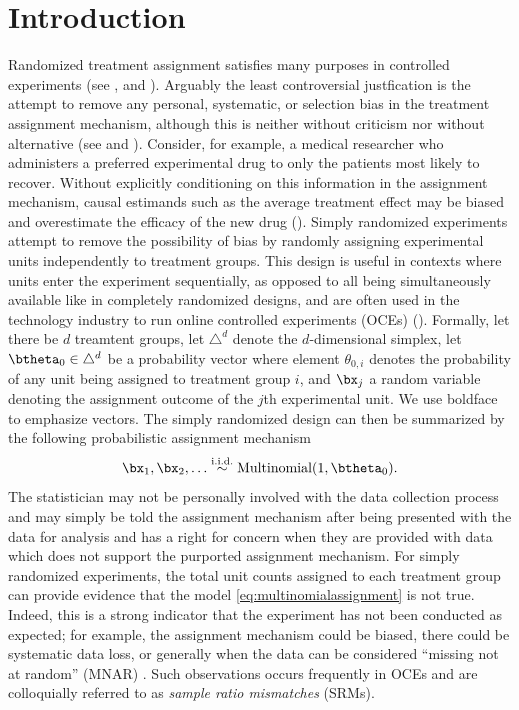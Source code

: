\documentclass[11pt]{article}
\begin{document}
\section{Introduction}
\label{sec:intro}
Randomized treatment assignment satisfies many purposes in controlled experiments (see \cite{kempthorne}, \cite{cox} and \cite{rubin}).
Arguably the least controversial justfication is the attempt to remove any personal, systematic, or selection bias in the treatment assignment mechanism, although this is neither without criticism nor without alternative (see \cite{lindley} and \cite{kadane}).
Consider, for example, a medical researcher who administers a preferred experimental drug to only the patients most likely to recover.
Without explicitly conditioning on this information in the assignment mechanism, causal estimands such as the average treatment effect may be biased and overestimate the efficacy of the new drug (\cite{berry}).
Simply randomized experiments attempt to remove the possibility of bias by randomly assigning experimental units independently to treatment groups.
This design is useful in contexts where units enter the experiment sequentially, as opposed to all being simultaneously available like in completely randomized designs, and are often used in the technology industry to run online controlled experiments (OCEs) (\cite{oce}).
Formally, let there be $d$ treamtent groups, let $\triangle^d$ denote the $d$-dimensional simplex, let $\btheta_0 \in \triangle^d$ be a probability vector where element $\theta_{0,i}$ denotes the probability of any unit being assigned to treatment group $i$, and $\bx_j$ a random variable denoting the assignment outcome of the $j$th experimental unit.
We use boldface to emphasize vectors.
The simply randomized design can then be summarized by the following probabilistic assignment mechanism
\begin{equation}
  \label{eq:multinomialassignment}
  \bx_1,\bx_2, \dots \stackrel{\text{i.i.d.}}{\sim} \text{Multinomial}(1,\btheta_0).
\end{equation}
The statistician may not be personally involved with the data collection process and may simply be told the assignment mechanism after being presented with the data for analysis and 
has a right for concern when they are provided with data which does not support the purported assignment mechanism.
For simply randomized experiments, the total unit counts assigned to each treatment group can provide evidence that the model \eqref{eq:multinomialassignment} is not true.
Indeed, this is a strong indicator that the experiment has not been conducted as expected; for example, the assignment mechanism could be biased, there could be systematic data loss, or generally when the data can be considered ``missing not at random'' (MNAR) \citep{missing-data}.
Such observations occurs frequently in OCEs and are colloquially referred to  as \textit{sample ratio mismatches} (SRMs).
\end{document}
